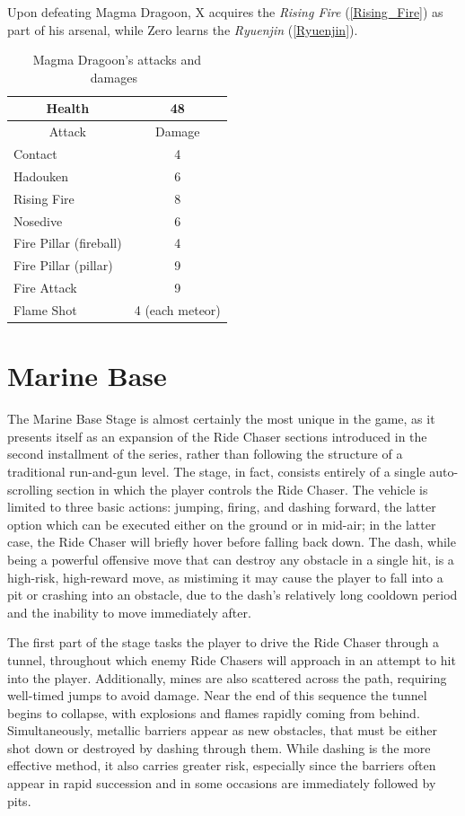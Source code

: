 Upon defeating Magma Dragoon, X acquires the \emph{Rising Fire} (\ref{Rising_Fire}) as part of his arsenal, while Zero learns the \emph{Ryuenjin} (\ref{Ryuenjin}).
\begin{table}[htp]
	\centering
	\begin{tabular}[h]{l c}
		\toprule
		\multicolumn{1}{c}{Health}  & 48\\
		\midrule
		\multicolumn{1}{c}{Attack} & \multicolumn{1}{c}{Damage}\\
		Contact & 4 \\
		Hadouken& 6 \\
		Rising Fire & 8 \\
		Nosedive& 6\\
		Fire Pillar (fireball)& 4\\
		Fire Pillar (pillar)& 9\\
		Fire Attack& 9\\
		Flame Shot& 4 (each meteor)\\
		\bottomrule
	\end{tabular}
	\caption{Magma Dragoon's attacks and damages~\cite{book:Compendium,wiki:Magma_dragoon}}
\end{table}

\section{Marine Base} 
The Marine Base Stage is almost certainly the most unique in the game, as it presents itself as an expansion of the Ride Chaser sections introduced in the second installment of the series, rather than following the structure of a traditional run-and-gun level. The stage, in fact, consists entirely of a single auto-scrolling section in which the player controls the Ride Chaser. The vehicle is limited to three basic actions: jumping, firing, and dashing forward, the latter option which can be executed either on the ground or in mid-air; in the latter case, the Ride Chaser will briefly hover before falling back down. The dash, while being a powerful offensive move that can destroy any obstacle in a single hit, is a high-risk, high-reward move, as mistiming it may cause the player to fall into a pit or crashing into an obstacle, due to the dash’s relatively long cooldown period and the inability to move immediately after.

The first part of the stage tasks the player to drive the Ride Chaser through a tunnel, throughout which enemy Ride Chasers will approach in an attempt to hit into the player. Additionally, mines are also scattered across the path, requiring well-timed jumps to avoid damage. Near the end of this sequence the tunnel begins to collapse, with explosions and flames rapidly coming from behind. Simultaneously, metallic barriers appear as new obstacles, that must be either shot down or destroyed by dashing through them. While dashing is the more effective method, it also carries greater risk, especially since the barriers often appear in rapid succession and in some occasions are immediately followed by pits.

